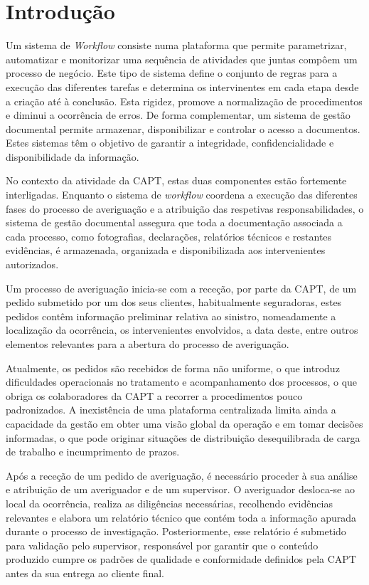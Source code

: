 ﻿%
%
\chapter{Introdução} \label{cap:intro}

Um sistema de \textit{Workflow} consiste numa plataforma que permite parametrizar, automatizar e monitorizar uma sequência de atividades que juntas compôem um processo de negócio.
Este tipo de sistema define o conjunto de regras para a execução das diferentes tarefas e determina os intervinentes em cada etapa desde a criação até à conclusão. Esta rigidez, promove a normalização de procedimentos e diminui a ocorrência de erros.
De forma complementar, um sistema de gestão documental permite armazenar, disponibilizar e controlar o acesso a documentos.
Estes sistemas têm o objetivo de garantir a integridade, confidencialidade e disponibilidade da informação.

No contexto da atividade da CAPT, estas duas componentes estão fortemente interligadas. Enquanto o sistema de \textit{workflow} coordena a execução das diferentes fases do processo de averiguação e a atribuição das respetivas responsabilidades, o sistema de gestão documental assegura que toda a documentação associada a cada processo, como fotografias, declarações, relatórios técnicos e restantes evidências, é armazenada, organizada e disponibilizada aos intervenientes autorizados.

Um processo de averiguação inicia-se com a receção, por parte da CAPT, de um pedido submetido por um dos seus clientes, habitualmente seguradoras, estes pedidos contêm informação preliminar relativa ao sinistro, nomeadamente a localização da ocorrência, os intervenientes envolvidos, a data deste, entre outros elementos relevantes para a abertura do processo de averiguação.

Atualmente, os pedidos são recebidos de forma não uniforme, o que introduz dificuldades operacionais no tratamento e acompanhamento dos processos, o que obriga os colaboradores da CAPT a recorrer a procedimentos pouco padronizados. A inexistência de uma plataforma centralizada limita ainda a capacidade da gestão em obter uma visão global da operação e em tomar decisões informadas, o que pode originar situações de distribuição desequilibrada de carga de trabalho e incumprimento de prazos.

Após a receção de um pedido de averiguação, é necessário proceder à sua análise e atribuição de um averiguador e de um supervisor. O averiguador desloca-se ao local da ocorrência, realiza as diligências necessárias, recolhendo evidências relevantes e elabora um relatório técnico que contém toda a informação apurada durante o processo de investigação. Posteriormente, esse relatório é submetido para validação pelo supervisor, responsável por garantir que o conteúdo produzido cumpre os padrões de qualidade e conformidade definidos pela CAPT antes da sua entrega ao cliente final.

